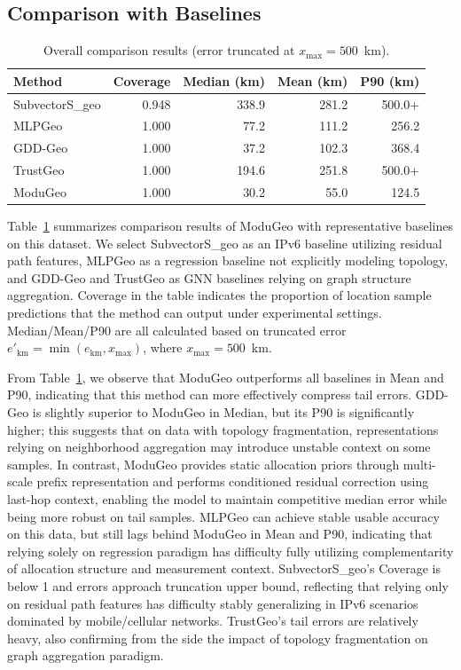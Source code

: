 \documentclass[runningheads]{llncs}
\begin{document}
\subsection{Comparison with Baselines}

\begin{table}[t]
\caption{Overall comparison results (error truncated at $x_{\max}=500$~km).}
\label{tab:comparison}
\centering
\small
\begin{tabular}{@{}lrrrr@{}}
\toprule
Method & Coverage & Median (km) & Mean (km) & P90 (km) \\
\midrule
SubvectorS\_geo & 0.948 & 338.9 & 281.2 & 500.0+ \\
MLPGeo & 1.000 & 77.2 & 111.2 & 256.2 \\
GDD-Geo & 1.000 & 37.2 & 102.3 & 368.4 \\
TrustGeo & 1.000 & 194.6 & 251.8 & 500.0+ \\
ModuGeo & 1.000 & 30.2 & 55.0 & 124.5 \\
\bottomrule
\end{tabular}
\end{table}

Table~\ref{tab:comparison} summarizes comparison results of ModuGeo with representative baselines on this dataset. We select SubvectorS\_geo as an IPv6 baseline utilizing residual path features, MLPGeo as a regression baseline not explicitly modeling topology, and GDD-Geo and TrustGeo as GNN baselines relying on graph structure aggregation. Coverage in the table indicates the proportion of location sample predictions that the method can output under experimental settings. Median/Mean/P90 are all calculated based on truncated error $e'_{\text{km}}=\min(e_{\text{km}},x_{\max})$, where $x_{\max}=500$~km.

From Table~\ref{tab:comparison}, we observe that ModuGeo outperforms all baselines in Mean and P90, indicating that this method can more effectively compress tail errors. GDD-Geo is slightly superior to ModuGeo in Median, but its P90 is significantly higher; this suggests that on data with topology fragmentation, representations relying on neighborhood aggregation may introduce unstable context on some samples. In contrast, ModuGeo provides static allocation priors through multi-scale prefix representation and performs conditioned residual correction using last-hop context, enabling the model to maintain competitive median error while being more robust on tail samples. MLPGeo can achieve stable usable accuracy on this data, but still lags behind ModuGeo in Mean and P90, indicating that relying solely on regression paradigm has difficulty fully utilizing complementarity of allocation structure and measurement context. SubvectorS\_geo's Coverage is below 1 and errors approach truncation upper bound, reflecting that relying only on residual path features has difficulty stably generalizing in IPv6 scenarios dominated by mobile/cellular networks. TrustGeo's tail errors are relatively heavy, also confirming from the side the impact of topology fragmentation on graph aggregation paradigm.
\end{document}
